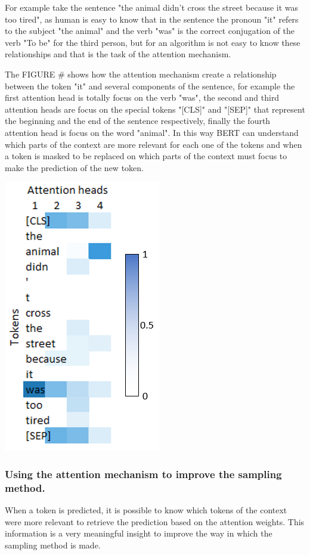 \documentclass[10pt,twocolumn,letterpaper]{article}
\begin{document}
For example take the sentence "the animal didn't cross the street because it was too tired",
as human is easy to know that in the sentence the pronoun "it" refers to the subject "the animal"
and the verb "was" is the correct conjugation of the verb "To be" for the third person, but for an
algorithm is not easy to know these relationships and that is the task of the attention mechanism.

The FIGURE # shows how the attention mechanism create a relationship between the token "it" and several components
of the sentence, for example the first attention head is totally focus on the verb "was", the second and third
attention heads are focus on the special tokens "[CLS]" and "[SEP]" that represent the beginning and the end of
the sentence respectively, finally the fourth attention head is focus on the word "animal". In this way BERT
can understand which parts of the context are more relevant for each one of the tokens and when a token
is masked to be replaced on which parts of the context must focus to make the prediction of the new token.

\includegraphics{attentionPlot.PNG}

\subsubsection{Using the attention mechanism to improve the sampling method.}
When a token is predicted, it is possible to know which tokens of the context were more relevant to
retrieve the prediction based on the attention weights.
This information is a very meaningful insight to improve
the way in which the sampling method is made.
\end{document}
